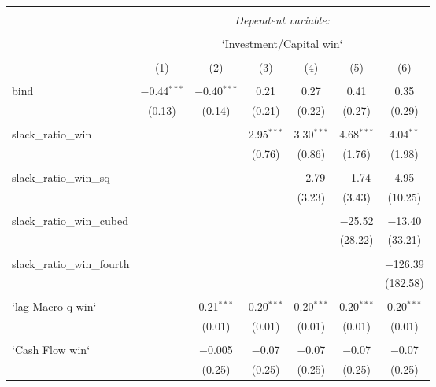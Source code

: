 
\begin{table}[!htbp] \centering 
  \caption{} 
  \label{} 
\begin{tabular}{@{\extracolsep{5pt}}lcccccc} 
\\[-1.8ex]\hline 
\hline \\[-1.8ex] 
 & \multicolumn{6}{c}{\textit{Dependent variable:}} \\ 
\cline{2-7} 
\\[-1.8ex] & \multicolumn{6}{c}{`Investment/Capital win`} \\ 
\\[-1.8ex] & (1) & (2) & (3) & (4) & (5) & (6)\\ 
\hline \\[-1.8ex] 
 bind & $-$0.44$^{***}$ & $-$0.40$^{***}$ & 0.21 & 0.27 & 0.41 & 0.35 \\ 
  & (0.13) & (0.14) & (0.21) & (0.22) & (0.27) & (0.29) \\ 
  & & & & & & \\ 
 slack\_ratio\_win &  &  & 2.95$^{***}$ & 3.30$^{***}$ & 4.68$^{***}$ & 4.04$^{**}$ \\ 
  &  &  & (0.76) & (0.86) & (1.76) & (1.98) \\ 
  & & & & & & \\ 
 slack\_ratio\_win\_sq &  &  &  & $-$2.79 & $-$1.74 & 4.95 \\ 
  &  &  &  & (3.23) & (3.43) & (10.25) \\ 
  & & & & & & \\ 
 slack\_ratio\_win\_cubed &  &  &  &  & $-$25.52 & $-$13.40 \\ 
  &  &  &  &  & (28.22) & (33.21) \\ 
  & & & & & & \\ 
 slack\_ratio\_win\_fourth &  &  &  &  &  & $-$126.39 \\ 
  &  &  &  &  &  & (182.58) \\ 
  & & & & & & \\ 
 `lag Macro q win` &  & 0.21$^{***}$ & 0.20$^{***}$ & 0.20$^{***}$ & 0.20$^{***}$ & 0.20$^{***}$ \\ 
  &  & (0.01) & (0.01) & (0.01) & (0.01) & (0.01) \\ 
  & & & & & & \\ 
 `Cash Flow win` &  & $-$0.005 & $-$0.07 & $-$0.07 & $-$0.07 & $-$0.07 \\ 
  &  & (0.25) & (0.25) & (0.25) & (0.25) & (0.25) \\ 

\end{tabular}
\end{table}

